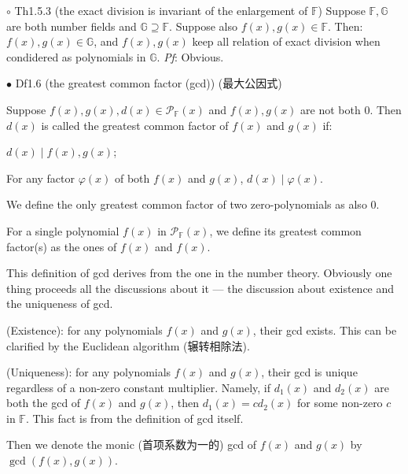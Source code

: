 \documentclass{article}
\begin{document}
\begin{Th}{$\circ$ Th1.5.3 (the exact division is invariant of the enlargement of $\mathbb{F}$)}
    Suppose $\mathbb{F}, \mathbb{G}$ are both number fields and $\mathbb{G}\supseteq\mathbb{F}$. Suppose also $f(x), g(x)\in \mathbb{F}$. Then:\\
    $f(x), g(x)\in\mathbb{G}$, and $f(x), g(x)$ keep all relation of exact division when condidered as polynomials in $\mathbb{G}$.
    \tcblower
    \textit{Pf}: Obvious. 
\end{Th}

\begin{Df}{$\bullet$ Df1.6 (the greatest common factor (gcd)) (最大公因式)}
    \begin{compactitem}
        \item Suppose $f(x), g(x), d(x)\in \mathcal{P}_\mathbb{F}(x)$ and $f(x), g(x)$ are not both $0$. Then $d(x)$ is called the greatest common factor of $f(x)$ and $g(x)$ if:
        \begin{compactenum}
            \item $d(x)\mid f(x), g(x)$;
            \item For any factor $\varphi(x)$ of both $f(x)$ and $g(x)$, $d(x)\mid \varphi(x)$.
        \end{compactenum}
        \item We define the only greatest common factor of two zero-polynomials as also $0$.
        \item For a single polynomial $f(x)$ in $\mathcal{P}_\mathbb{F}(x)$, we define its greatest common factor(s) as the ones of $f(x)$ and $f(x)$.
    \end{compactitem}
\end{Df}

\begin{Rmk}{}
    This definition of gcd derives from the one in the number theory. Obviously one thing proceeds all the discussions about it — the discussion about existence and the uniqueness of gcd.
    \begin{compactenum}
        \item \textcolor{Th}{(Existence): for any polynomials $f(x)$ and $g(x)$, their gcd exists.} This can be clarified by the Euclidean algorithm (辗转相除法).
        \item \textcolor{Th}{(Uniqueness): for any polynomials $f(x)$ and $g(x)$, their gcd is unique regardless of a non-zero constant multiplier.} Namely, if $d_1(x)$ and $d_2(x)$ are both the gcd of $f(x)$ and $g(x)$, then $d_1(x) = cd_2(x)$ for some non-zero $c$ in $\mathbb{F}$. This fact is from the definition of gcd itself.
    \end{compactenum}
    \textcolor{Df}{Then we denote the monic (首项系数为一的) gcd of $f(x)$ and $g(x)$ by $\gcd(f(x), g(x))$.}
\end{Rmk}
\end{document}
